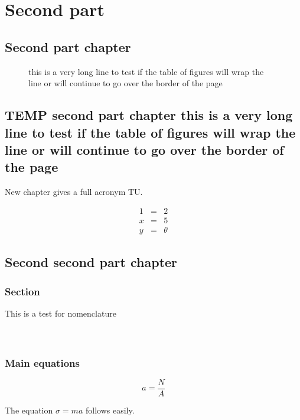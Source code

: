     \part{Second part}

    \chapter{Second part chapter}
   \begin{figure}
    \caption{this is a very long line to test if the table of
    figures will wrap the line or will continue to go over the
    border  of the page}
    \end{figure}

    \chapter{TEMP second part chapter this is a very long line to test if the table of
    figures will wrap the line or will continue to go over the
    border  of the page}

New chapter gives a full acronym \ac{TU}.

\begin{eqnarray}
  1 &=& 2\\
  x &=& 5 \\
  y &=& \theta
\end{eqnarray}

    \chapter{Second second part chapter}
    \section{Section}

    This is a test for nomenclature \\
    \\
    \\
\section{Main equations}

\begin{equation}
a=\frac{N}{A}
\end{equation}%

%
%
%

The equation $\sigma = m a$%
%
follows easily.